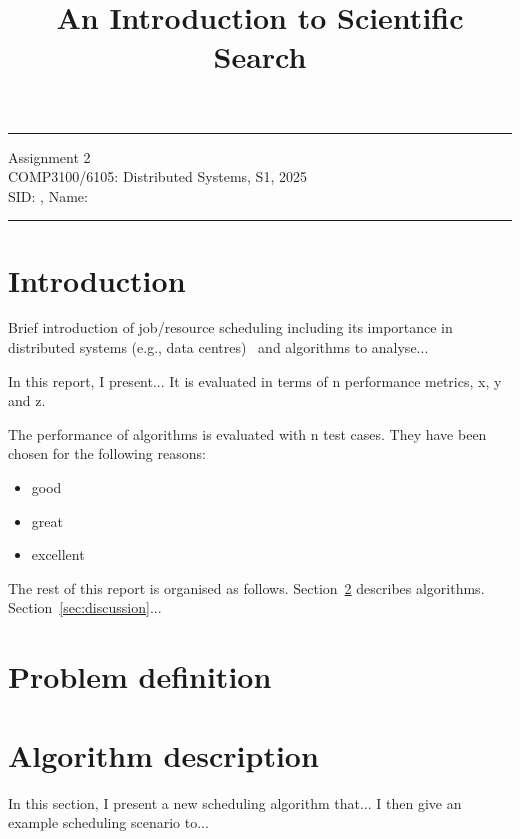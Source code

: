 \documentclass[a4paper]{article} %
\begin{document}

\title{An Introduction to Scientific Search} %
\fancyhead[C]{}
\hrule \medskip %
\begin{minipage}{1\textwidth} %
\centering 
\large %
Assignment 2\\ %
COMP3100/6105: Distributed Systems, S1, 2025\\
\normalsize %
SID: , Name:
\end{minipage}
\medskip\hrule %
\bigskip

\section{Introduction}
Brief introduction of job/resource scheduling including its importance in distributed systems (e.g., data centres)~\cite{mesos2011} and algorithms to analyse...

In this report, I present... It is evaluated in terms of n performance metrics, x, y and z. 

The performance of algorithms is evaluated with n test cases. They have been chosen for the following reasons:
\begin{itemize}
\item good
\item great
\item excellent
\end{itemize}

The rest of this report is organised as follows. Section~\ref{sec:problem} describes algorithms. Section~\ref{sec:discussion}...

\section{Problem definition}
\label{sec:problem}

\section{Algorithm description}
\label{sec:algo}
In this section, I present a new scheduling algorithm that... I then give an example scheduling scenario to...
\end{document}

